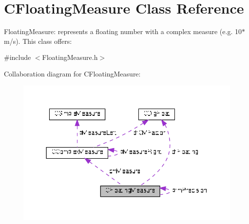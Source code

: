 \hypertarget{classCFloatingMeasure}{}\section{C\+Floating\+Measure Class Reference}
\label{classCFloatingMeasure}


Floating\+Measure\+: represents a floating number with a complex measure (e.\+g. 10$\ast$m/s). This class offers\+:  




{\ttfamily \#include $<$Floating\+Measure.\+h$>$}



Collaboration diagram for C\+Floating\+Measure\+:\nopagebreak
\begin{figure}[H]
\begin{center}
\leavevmode
\includegraphics[width=350pt]{d5/d9a/classCFloatingMeasure__coll__graph}
\end{center}
\end{figure}
